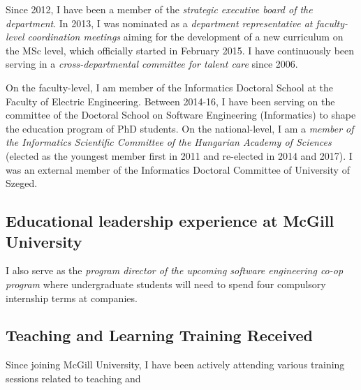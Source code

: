 \documentclass[a4paper,11pt]{report}
\begin{document}
Since 2012, I have been a member of the \emph{strategic executive board of the department}. In 2013, I was nominated as a \emph{department representative at faculty-level coordination meetings} aiming for the development of a new curriculum on the MSc level, which officially started in February 2015. I have continuously been serving in a \emph{cross-departmental committee for talent care} since 2006. 

On the faculty-level, I am member of the Informatics Doctoral School at the Faculty of Electric Engineering. Between 2014-16, I have been serving on the committee of the Doctoral School on Software Engineering (Informatics) to shape the education program of PhD students. On the national-level, I am a \emph{member of the Informatics Scientific Committee of the Hungarian Academy of Sciences} (elected as the youngest member first in 2011 and re-elected in 2014 and 2017). I was an external member of the Informatics Doctoral Committee of University of Szeged.

\subsection{Educational leadership experience at McGill University}


I also serve as the \emph{program director of the upcoming software engineering co-op program } where undergraduate students will need to spend four compulsory internship terms at companies.

\subsection{Teaching and Learning Training Received}
Since joining McGill University, I have been actively attending various training sessions related to teaching and 
\end{document}
